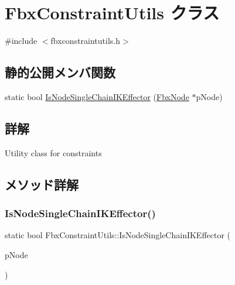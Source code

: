 \hypertarget{class_fbx_constraint_utils}{}\section{Fbx\+Constraint\+Utils クラス}
\label{class_fbx_constraint_utils}


{\ttfamily \#include $<$fbxconstraintutils.\+h$>$}

\subsection*{静的公開メンバ関数}
\begin{DoxyCompactItemize}
\item 
static bool \hyperlink{class_fbx_constraint_utils_a8dd6ec50d31660b74f0195d729714eb7}{Is\+Node\+Single\+Chain\+I\+K\+Effector} (\hyperlink{class_fbx_node}{Fbx\+Node} $\ast$p\+Node)
\end{DoxyCompactItemize}


\subsection{詳解}
Utility class for constraints 

\subsection{メソッド詳解}
\mbox{\label{class_fbx_constraint_utils_a8dd6ec50d31660b74f0195d729714eb7}} 
\subsubsection{\texorpdfstring{Is\+Node\+Single\+Chain\+I\+K\+Effector()}{IsNodeSingleChainIKEffector()}}
{\footnotesize\ttfamily static bool Fbx\+Constraint\+Utils\+::\+Is\+Node\+Single\+Chain\+I\+K\+Effector (\begin{DoxyParamCaption}\item[{\hyperlink{class_fbx_node}{Fbx\+Node} $\ast$}]{p\+Node }\end{DoxyParamCaption})\hspace{0.3cm}{\ttfamily [static]}}

